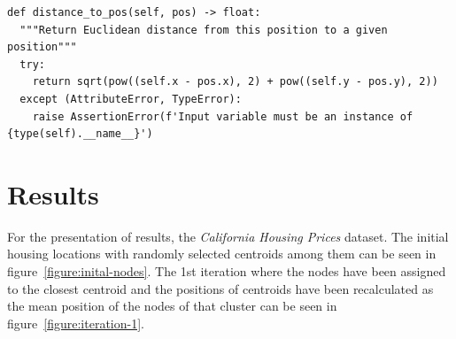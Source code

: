 \documentclass[a4paper]{article}
\newcommand{\code}{\texttt}
\begin{document}
\begin{lstlisting}[caption={Function that calculates distance between two positions - \code{self} refers to the \code{Position} class.}, label={code:euclidean-distance}]
def distance_to_pos(self, pos) -> float:
  """Return Euclidean distance from this position to a given position"""
  try:
    return sqrt(pow((self.x - pos.x), 2) + pow((self.y - pos.y), 2))
  except (AttributeError, TypeError):
    raise AssertionError(f'Input variable must be an instance of {type(self).__name__}')
\end{lstlisting}




\section{Results}\label{section:results}
For the presentation of results, the \textit{California Housing Prices} dataset\cite{PJZZoRfZVMc9ZRlw}. The initial housing locations with randomly selected centroids among them can be seen in figure~\ref{figure:inital-nodes}. The 1st iteration where the nodes have been assigned to the closest centroid and the positions of centroids have been recalculated as the mean position of the nodes of that cluster can be seen in figure~\ref{figure:iteration-1}.
\end{document}
